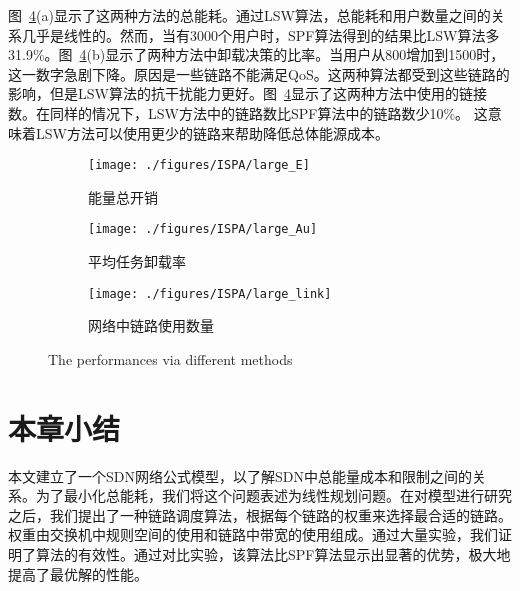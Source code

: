 图~\ref{fig_large}(a)显示了这两种方法的总能耗。通过LSW算法，总能耗和用户数量之间的关系几乎是线性的。然而，当有3000个用户时，SPF算法得到的结果比LSW算法多31.9\%。图~\ref{fig_large}(b)显示了两种方法中卸载决策的比率。当用户从800增加到1500时，这一数字急剧下降。原因是一些链路不能满足QoS。这两种算法都受到这些链路的影响，但是LSW算法的抗干扰能力更好。图~\ref{fig_large}显示了这两种方法中使用的链接数。在同样的情况下，LSW方法中的链路数比SPF算法中的链路数少10\%。 这意味着LSW方法可以使用更少的链路来帮助降低总体能源成本。

\begin{figure}[!h]
  \centering
  \begin{subfigure}[b]{0.32\linewidth}
    \texttt{[image: ./figures/ISPA/large\_E]}
    \label{fig_largeE}
    \caption{能量总开销}
  \end{subfigure}
  \begin{subfigure}[b]{0.32\linewidth}
    \texttt{[image: ./figures/ISPA/large\_Au]}
    \label{fig_largeAu}
    \caption{平均任务卸载率}
  \end{subfigure}
  \begin{subfigure}[b]{0.32\linewidth}
    \texttt{[image: ./figures/ISPA/large\_link]}
    \label{fig_largeL}
    \caption{网络中链路使用数量}
  \end{subfigure}
  \caption{The performances via different methods}
  \label{fig_large}
\end{figure}

\section{本章小结}

本文建立了一个SDN网络公式模型，以了解SDN中总能量成本和限制之间的关系。为了最小化总能耗，我们将这个问题表述为线性规划问题。在对模型进行研究之后，我们提出了一种链路调度算法，根据每个链路的权重来选择最合适的链路。权重由交换机中规则空间的使用和链路中带宽的使用组成。通过大量实验，我们证明了算法的有效性。通过对比实验，该算法比SPF算法显示出显著的优势，极大地提高了最优解的性能。


